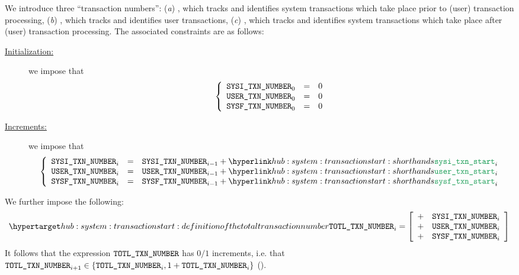 We introduce three ``transaction numbers'':
(\emph{a}) \sysiTransactionNumber{}, which tracks and identifies system transactions which take place prior to (user) transaction processing,
(\emph{b}) \userTransactionNumber{}, which tracks and identifies user transactions,
(\emph{c}) \sysfTransactionNumber{}, which tracks and identifies system transactions which take place after (user) transaction processing.
The associated constraints are as follows:
\begin{description}
	\item[\underline{Initialization:}] 
		we impose that
		\[
			\left\{ \begin{array}{lcl}
				\texttt{SYSI}\texttt{\_}\texttt{TXN\_NUMBER} _{0} & = & 0 \\
				\texttt{USER}\texttt{\_}\texttt{TXN\_NUMBER} _{0} & = & 0 \\
				\texttt{SYSF}\texttt{\_}\texttt{TXN\_NUMBER} _{0} & = & 0 \\
			\end{array} \right.
		\]
	\item[\underline{Increments:}] 
		we impose that
		\[
			\left\{ \begin{array}{lcl}
				\sysiTransactionNumber _{i} & = & \sysiTransactionNumber _{i - 1} + \sysiTransactionStart _{i} \\
				\userTransactionNumber _{i} & = & \userTransactionNumber _{i - 1} + \userTransactionStart _{i} \\
				\sysfTransactionNumber _{i} & = & \sysfTransactionNumber _{i - 1} + \sysfTransactionStart _{i} \\
			\end{array} \right.
		\]
\end{description}
We further impose the following:
\[
	\hlabel{hub: system: transaction start: definition of the total transaction number}
	\totalTransactionNumber _{i}
	=
	\left[ \begin{array}{cr}
		+ & \sysiTransactionNumber _{i} \\
		+ & \userTransactionNumber _{i} \\
		+ & \sysfTransactionNumber _{i} \\
	\end{array} \right]
\]
\saNote{} \label{hub: system: transaction start: total transaction number increments}
It follows that the expression $\texttt{TOTL}\texttt{\_}\texttt{TXN\_NUMBER}$ has $0/1$ increments, i.e. that
$\texttt{TOTL}\texttt{\_}\texttt{TXN\_NUMBER} _{i + 1} \in \{ \texttt{TOTL}\texttt{\_}\texttt{TXN\_NUMBER} _{i}, 1 + \texttt{TOTL}\texttt{\_}\texttt{TXN\_NUMBER} _{i} \}$ (\sanityCheck).
